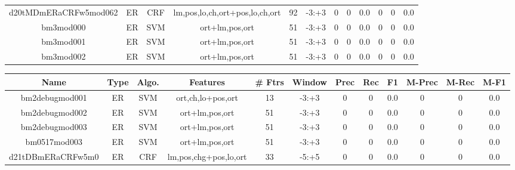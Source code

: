 \documentclass[a4paper]{article}
\begin{document}
\begin{landscape}
\begin{center}
\begin{tabular}{ |c|c|c|c|c|c|c|c|c|c|c|c|}
 
 	
 	\small{ d20tMDmERaCRFw5mod062 } & ER & CRF & lm,pos,lo,ch,ort+pos,lo,ch,ort  &  92 &  -3:+3  &  0 & 0 & 0.0  &  0 & 0 & 0.0 \\
 	

 
 	
 	\small{ bm3mod000 } & ER & SVM & ort+lm,pos,ort  &  51 &  -3:+3  &  0 & 0 & 0.0  &  0 & 0 & 0.0 \\
 	

 
 	
 	\small{ bm3mod001 } & ER & SVM & ort+lm,pos,ort  &  51 &  -3:+3  &  0 & 0 & 0.0  &  0 & 0 & 0.0 \\
 	

 
 	
 	\small{ bm3mod002 } & ER & SVM & ort+lm,pos,ort  &  51 &  -3:+3  &  0 & 0 & 0.0  &  0 & 0 & 0.0 \\
 	
 \hline
\end{tabular}
\end{center}




\begin{center}
\begin{tabular}{ |c|c|c|c|c|c|c|c|c|c|c|c|} 
 \hline
 	Name & Type & Algo. & Features & \# Ftrs & Window & Prec & Rec & F1 & M-Prec & M-Rec & M-F1\\
 \hline

 	

 
 	
 	\small{ bm2debugmod001 } & ER & SVM & ort,ch,lo+pos,ort  &  13 &  -3:+3  &  0 & 0 & 0.0  &  0 & 0 & 0.0 \\
 	

 
 	
 	\small{ bm2debugmod002 } & ER & SVM & ort+lm,pos,ort  &  51 &  -3:+3  &  0 & 0 & 0.0  &  0 & 0 & 0.0 \\
 	

 
 	
 	\small{ bm2debugmod003 } & ER & SVM & ort+lm,pos,ort  &  51 &  -3:+3  &  0 & 0 & 0.0  &  0 & 0 & 0.0 \\
 	

 
 	
 	\small{ bm0517mod003 } & ER & SVM & ort+lm,pos,ort  &  51 &  -3:+3  &  0 & 0 & 0.0  &  0 & 0 & 0.0 \\
 	

 
 	
 	\small{ d21tDBmERaCRFw5m0 } & ER & CRF & lm,pos,chg+pos,lo,ort  &  33 &  -5:+5  &  0 & 0 & 0.0  &  0 & 0 & 0.0 \\
 	


\end{tabular}
\end{center}
\end{landscape}
\end{document}
